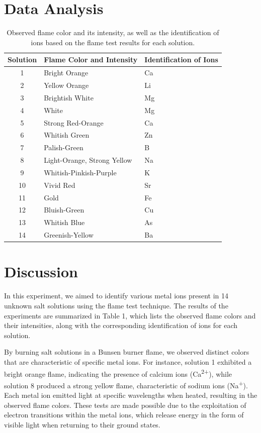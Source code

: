 \documentclass[11pt]{article}
\begin{document}
\section*{Data Analysis}
\begin{table}[H]
\centering

\label{tab:flame-test}
\begin{tabular}{c>{\raggedright\arraybackslash}p{4cm}>{\raggedright\arraybackslash}p{5cm}}
\toprule
\textbf{Solution} & \textbf{Flame Color and Intensity} & \textbf{Identification of Ions} \\
\midrule
1  & Bright Orange & Ca \\
2  & Yellow Orange & Li \\
3  & Brightish White & Mg \\
4  & White & Mg \\
5  & Strong Red-Orange & Ca \\
6  & Whitish Green & Zn \\
7  & Palish-Green & B \\
8  & Light-Orange, Strong Yellow & Na \\
9  & Whitish-Pinkish-Purple & K \\
10 & Vivid Red & Sr \\
11 & Gold & Fe \\
12 & Bluish-Green & Cu \\
13 & Whitish Blue & As \\
14 & Greenish-Yellow & Ba \\
\bottomrule
\end{tabular}
\caption{Observed flame color and its intensity, as well as the identification of ions based on the flame test results for each solution.}
\end{table}

\section*{Discussion}

\setlength{\parindent}{2em} %

In this experiment, we aimed to identify various metal ions present in 14 unknown salt solutions using the flame test technique. The results of the experiments are summarized in Table 1, which lists the observed flame colors and their intensities, along with the corresponding identification of ions for each solution.

By burning salt solutions in a Bunsen burner flame, we observed distinct colors that are characteristic of specific metal ions. For instance, solution 1 exhibited a bright orange flame, indicating the presence of calcium ions (Ca\textsuperscript{2+}), while solution 8 produced a strong yellow flame, characteristic of sodium ions (Na\textsuperscript{+}). Each metal ion emitted light at specific wavelengths when heated, resulting in the observed flame colors. These tests are made possible due to the exploitation of electron transitions within the metal ions, which release energy in the form of visible light when returning to their ground states.
\end{document}

